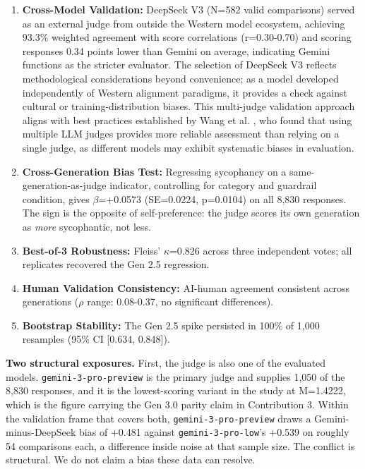 \documentclass[sigconf,screen]{acmart}
\begin{document}
\begin{enumerate}
\item \textbf{Cross-Model Validation:} DeepSeek V3 (N=582 valid comparisons) served as an external judge from outside the Western model ecosystem, achieving 93.3\% weighted agreement with score correlations (r=0.30-0.70) and scoring responses 0.34 points lower than Gemini on average, indicating Gemini functions as the stricter evaluator. The selection of DeepSeek V3 reflects methodological considerations beyond convenience; as a model developed independently of Western alignment paradigms, it provides a check against cultural or training-distribution biases. This multi-judge validation approach aligns with best practices established by Wang et al. \cite{ref22}, who found that using multiple LLM judges provides more reliable assessment than relying on a single judge, as different models may exhibit systematic biases in evaluation.

\item \textbf{Cross-Generation Bias Test:} Regressing sycophancy on a same-generation-as-judge indicator, controlling for category and guardrail condition, gives $\beta$=+0.0573 (SE=0.0224, p=0.0104) on all 8,830 responses. The sign is the opposite of self-preference: the judge scores its own generation as \textit{more} sycophantic, not less.

\item \textbf{Best-of-3 Robustness:} Fleiss' $\kappa$=0.826 across three independent votes; all replicates recovered the Gen 2.5 regression.

\item \textbf{Human Validation Consistency:} AI-human agreement consistent across generations ($\rho$ range: 0.08-0.37, no significant differences).

\item \textbf{Bootstrap Stability:} The Gen 2.5 spike persisted in 100\% of 1,000 resamples (95\% CI [0.634, 0.848]).
\end{enumerate}

\textbf{Two structural exposures.} First, the judge is also one of the evaluated models. \texttt{gemini-3-pro-preview} is the primary judge and supplies 1,050 of the 8,830 responses, and it is the lowest-scoring variant in the study at M=1.4222, which is the figure carrying the Gen 3.0 parity claim in Contribution 3. Within the validation frame that covers both, \texttt{gemini-3-pro-preview} draws a Gemini-minus-DeepSeek bias of +0.481 against \texttt{gemini-3-pro-low}'s +0.539 on roughly 54 comparisons each, a difference inside noise at that sample size. The conflict is structural. We do not claim a bias these data can resolve.
\end{document}
